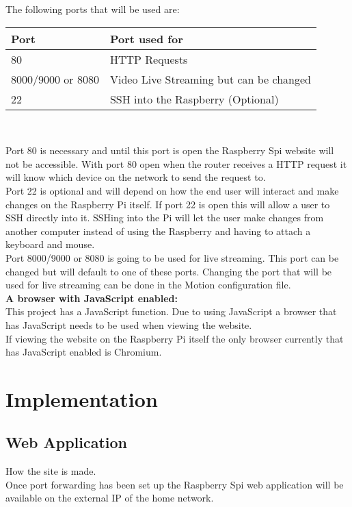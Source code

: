 \documentclass[]{report}
\begin{document}
The following ports that will be used are:

\begin{center}
    \begin{tabular}{ | l | p{7cm} |}
    \hline
    {\bf Port} & {\bf Port used for} \\ \hline
   80 & HTTP Requests \\ \hline 
   8000/9000 or 8080 & Video Live Streaming but can be changed\\ \hline
	22 & SSH into the Raspberry (Optional) \\ \hline
    \end{tabular}
    \\[0.5cm]
\end{center} 

Port 80 is necessary and until this port is open the Raspberry Spi website will not be accessible. With port 80 open when the router receives a HTTP request it will know which device on the network to send the request to.\\

Port 22 is optional and will depend on how the end user will interact and make changes on the Raspberry Pi itself. If port 22 is open this will allow a user to SSH directly into it. SSHing into the Pi will let the user make changes from another computer instead of using the Raspberry and having to attach a keyboard and mouse.\\

Port 8000/9000 or 8080 is going to be used for live streaming. This port can be changed but will default to one of these ports. Changing the port that will be used for live streaming can be done in the Motion configuration file.\\

\noindent
{\bf A browser with JavaScript enabled:}\\
\break
This project has a JavaScript function. Due to using JavaScript a browser that has JavaScript needs to be used when viewing the website.\\

If viewing the website on the Raspberry Pi itself the only browser currently that has JavaScript enabled is Chromium.\\
%
%
\chapter{Implementation}
\label{ch:implem}
\section{Web Application}
\label{sec:webapp}
How the site is made.\\
Once port forwarding has been set up the Raspberry Spi web application will be available on the external IP of the home network.
\end{document}
